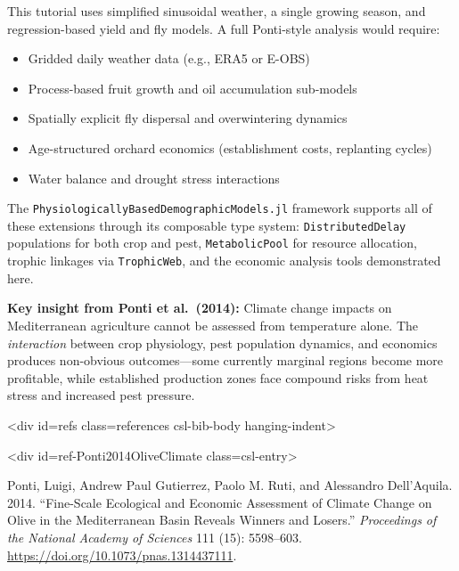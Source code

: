 \label{6201191322654301273}{}


This tutorial uses simplified sinusoidal weather, a single growing season, and regression-based yield and fly models. A full Ponti-style analysis would require:



\begin{itemize}
\item Gridded daily weather data (e.g., ERA5 or E-OBS)


\item Process-based fruit growth and oil accumulation sub-models


\item Spatially explicit fly dispersal and overwintering dynamics


\item Age-structured orchard economics (establishment costs, replanting cycles)


\item Water balance and drought stress interactions

\end{itemize}


The \texttt{PhysiologicallyBasedDemographicModels.jl} framework supports all of these extensions through its composable type system: \texttt{DistributedDelay} populations for both crop and pest, \texttt{MetabolicPool} for resource allocation, trophic linkages via \texttt{TrophicWeb}, and the economic analysis tools demonstrated here.



\textbf{Key insight from Ponti et al.~(2014):} Climate change impacts on Mediterranean agriculture cannot be assessed from temperature alone. The \emph{interaction} between crop physiology, pest population dynamics, and economics produces non-obvious outcomes—some currently marginal regions become more profitable, while established production zones face compound risks from heat stress and increased pest pressure.



<div id={\textquotedbl}refs{\textquotedbl} class={\textquotedbl}references csl-bib-body hanging-indent{\textquotedbl}>



<div id={\textquotedbl}ref-Ponti2014OliveClimate{\textquotedbl} class={\textquotedbl}csl-entry{\textquotedbl}>



Ponti, Luigi, Andrew Paul Gutierrez, Paolo M. Ruti, and Alessandro Dell’Aquila. 2014. “Fine-Scale Ecological and Economic Assessment of Climate Change on Olive in the Mediterranean Basin Reveals Winners and Losers.” \emph{Proceedings of the National Academy of Sciences} 111 (15): 5598–603. \href{https://doi.org/10.1073/pnas.1314437111}{https://doi.org/10.1073/pnas.1314437111}.



